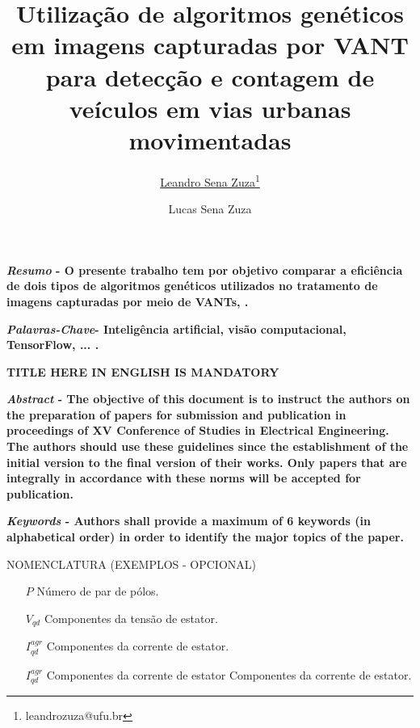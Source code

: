 \documentclass{ceel}
\title{Utilização de algoritmos genéticos em imagens capturadas por VANT para detecção e contagem de veículos em vias urbanas movimentadas}
\author[1]{\underline{Leandro Sena Zuza}\thanks{leandrozuza@ufu.br}}
\author[2]{Lucas Sena Zuza}
\affil[1]{FEELT - Universidade Federal de Uberlândia}
\begin{document}
\inserirtitulo

\begin{multicols}{2}

\textbf{\emph{Resumo} - O presente trabalho tem por objetivo comparar a eficiência de dois tipos de algoritmos genéticos utilizados no tratamento de imagens capturadas por meio de VANTs, .}
\vspace*{10pt}

\textbf{\emph{Palavras-Chave}- Inteligência artificial, visão computacional, TensorFlow, ... .}


\begin{center}
\noindent\textbf{\large \uppercase{TITLE HERE IN ENGLISH IS MANDATORY}}
\end{center}

\textbf{\emph{Abstract} - The objective of this document is to instruct the authors on the preparation of papers for submission and publication in proceedings of XV Conference of Studies in Electrical Engineering. The authors should use these guidelines since the establishment of the initial version to the final version of their works. Only papers that are integrally in accordance with these norms will be accepted for publication. }
\vspace*{10pt}

\textbf{\emph{Keywords} - Authors shall provide a maximum of 6 keywords (in alphabetical order) in order to identify the major topics of the paper.}


\begin{center}
\uppercase{NOMENCLATURA (EXEMPLOS - OPCIONAL)}
\end{center}
\begin{itemize}
\setlength\itemsep{1mm}
\item [$P$] Número de par de pólos.
\item [$V_{qd}$] Componentes da tensão de estator.
\item [$I^{agr}_{qd}$] Componentes da corrente de estator.
\item [$I^{agr}_{qd}$] Componentes da corrente de estator Componentes da corrente de estator.
\end{itemize}


\end{multicols}
\end{document}
